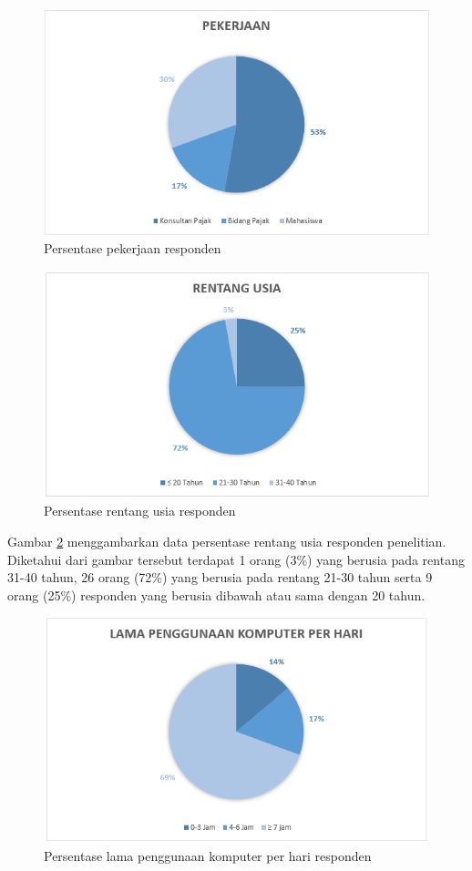 \begin{figure}
	\centering
	\includegraphics[width=\textwidth]
	{pics/pekerjaan.PNG}
	\caption{Persentase pekerjaan responden}
	\label{fig:kerja}
\end{figure}
\begin{figure}
	\centering
	\includegraphics[width=\textwidth]
	{pics/rentangUsia.PNG}
	\caption{Persentase rentang usia responden}
	\label{fig:usia}
\end{figure}
\noindent
Gambar \ref{fig:usia} menggambarkan data persentase rentang usia responden penelitian. Diketahui dari gambar tersebut terdapat 1 orang (3\%) yang berusia pada rentang 31-40 tahun, 26 orang (72\%) yang berusia pada rentang 21-30 tahun serta 9 orang (25\%) responden yang berusia dibawah atau sama dengan 20 tahun.
\begin{figure}
	\centering
	\includegraphics[width=\textwidth]
	{pics/lamakomputer.PNG}
	\caption{Persentase lama penggunaan komputer per hari responden}
	\label{fig:komp}
\end{figure}
